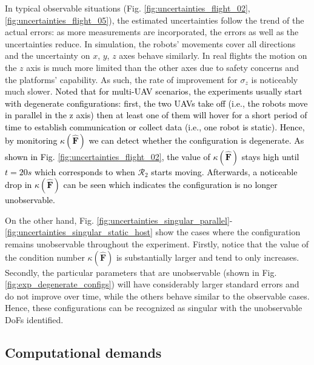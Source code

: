 \documentclass[journal]{IEEEtran}
\def\Robot{\mathcal{R}}
\def\FIM{\mathbf{F}}
\def\condF{\kappa(\hat{\FIM})}
\begin{document}
In typical observable situations (Fig. \ref{fig:uncertainties_flight_02}, \ref{fig:uncertainties_flight_05}), the estimated uncertainties follow the trend of the actual errors: as more measurements are incorporated, the errors as well as the uncertainties reduce. In simulation, the robots' movements cover all directions and the uncertainty on $x$, $y$, $z$ axes behave similarly. In real flights the motion on the $z$ axis is much more limited than the other axes due to safety concerns and the platforms' capability. As such, the rate of improvement for $\sigma_z$ is noticeably much slower. 
\textcolor{black}{
Noted that for multi-UAV scenarios, the experiments usually start with degenerate configurations: first, the two UAVs take off (i.e., the robots move in parallel in the z axis) then at least one of them will hover for a short period of time to establish communication or collect data (i.e., one robot is static). Hence, by monitoring $\condF$ we can detect whether the configuration is degenerate. As shown in Fig. \ref{fig:uncertainties_flight_02}, the value of $\condF$ stays high until $t=20\si{s}$ which corresponds to when $\Robot_2$ starts moving. Afterwards, a noticeable drop in $\condF$ can be seen which indicates the configuration is no longer unobservable.
}

On the other hand, Fig. \ref{fig:uncertainties_singular_parallel}-\ref{fig:uncertainties_singular_static_host} show the cases where the configuration remains unobservable throughout the experiment. Firstly, notice that the value of the condition number $\condF$ is substantially larger and tend to only increases. Secondly, the particular parameters that are unobservable (shown in Fig. \ref{fig:exp_degenerate_configs}) will have considerably larger standard errors and do not improve over time, while the others behave similar to the observable cases. Hence, these configurations can be recognized as singular with the unobservable DoFs identified.


\subsection{Computational demands}
\end{document}
